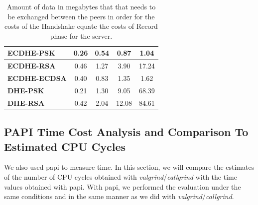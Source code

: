 \begin{table}[]
\begin{tabular}{|l|c|c|c|c|}
    \textbf{ECDHE-PSK}   & 0.26                                                        & 0.54                                                           & 0.87                                                         & 1.04                                                              \\ \hline
    \textbf{ECDHE-RSA}   & 0.46                                                        & 1.27                                                           & 3.90                                                         & 17.24                                                             \\ \hline
    \textbf{ECDHE-ECDSA} & 0.40                                                        & 0.83                                                           & 1.35                                                         & 1.62                                                              \\ \hline
    \textbf{DHE-PSK}     & 0.21                                                        & 1.30                                                           & 9.05                                                         & 68.39                                                             \\ \hline
    \textbf{DHE-RSA}     & 0.42                                                        & 2.04                                                           & 12.08                                                        & 84.61                                                             \\ \hline
    \end{tabular}
    \caption{Amount of data in megabytes that that needs to be exchanged between the peers in order for the costs of the Handshake equate the costs of Record phase for the server.}
    \label{tab:conf-hs-server}
    \end{table}

\subsection{PAPI Time Cost Analysis and Comparison To Estimated CPU Cycles }

We also used \gls{papi} to measure time. In this section, we will compare the estimates of the number of CPU cycles
obtained with \textit{valgrind}/\textit{callgrind} with the time values obtained with \gls{papi}.
With \gls{papi}, we performed the evaluation under the same conditions and in the same manner as we did with \textit{valgrind}/\textit{callgrind}. 

